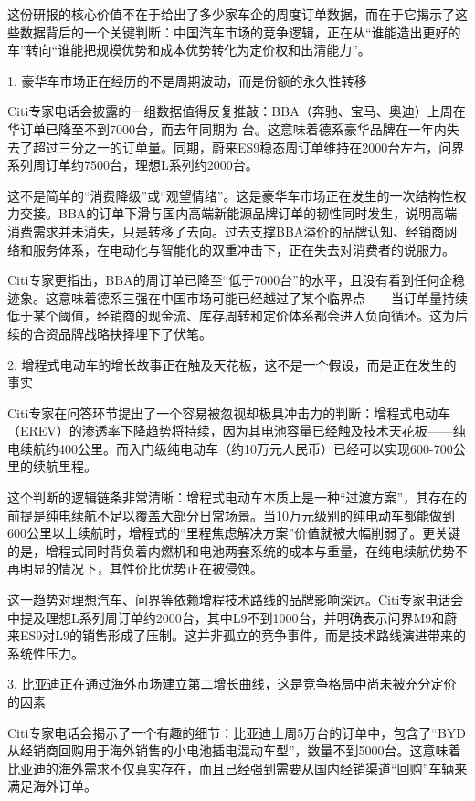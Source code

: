 \documentclass[11pt]{ctexart}
\begin{document}
这份研报的核心价值不在于给出了多少家车企的周度订单数据，而在于它揭示了这些数据背后的一个关键判断：中国汽车市场的竞争逻辑，正在从“谁能造出更好的车”转向“谁能把规模优势和成本优势转化为定价权和出清能力”。

1. 豪华车市场正在经历的不是周期波动，而是份额的永久性转移

Citi专家电话会披露的一组数据值得反复推敲：BBA（奔驰、宝马、奥迪）上周在华订单已降至不到7000台，而去年同期为 台。这意味着德系豪华品牌在一年内失去了超过三分之一的订单量。同期，蔚来ES9稳态周订单维持在2000台左右，问界系列周订单约7500台，理想L系列约2000台。

这不是简单的“消费降级”或“观望情绪”。这是豪华车市场正在发生的一次结构性权力交接。BBA的订单下滑与国内高端新能源品牌订单的韧性同时发生，说明高端消费需求并未消失，只是转移了去向。过去支撑BBA溢价的品牌认知、经销商网络和服务体系，在电动化与智能化的双重冲击下，正在失去对消费者的说服力。

Citi专家更指出，BBA的周订单已降至“低于7000台”的水平，且没有看到任何企稳迹象。这意味着德系三强在中国市场可能已经越过了某个临界点——当订单量持续低于某个阈值，经销商的现金流、库存周转和定价体系都会进入负向循环。这为后续的合资品牌战略抉择埋下了伏笔。

2. 增程式电动车的增长故事正在触及天花板，这不是一个假设，而是正在发生的事实

Citi专家在问答环节提出了一个容易被忽视却极具冲击力的判断：增程式电动车（EREV）的渗透率下降趋势将持续，因为其电池容量已经触及技术天花板——纯电续航约400公里。而入门级纯电动车（约10万元人民币）已经可以实现600-700公里的续航里程。

这个判断的逻辑链条非常清晰：增程式电动车本质上是一种“过渡方案”，其存在的前提是纯电续航不足以覆盖大部分日常场景。当10万元级别的纯电动车都能做到600公里以上续航时，增程式的“里程焦虑解决方案”价值就被大幅削弱了。更关键的是，增程式同时背负着内燃机和电池两套系统的成本与重量，在纯电续航优势不再明显的情况下，其性价比优势正在被侵蚀。

这一趋势对理想汽车、问界等依赖增程技术路线的品牌影响深远。Citi专家电话会中提及理想L系列周订单约2000台，其中L9不到1000台，并明确表示问界M9和蔚来ES9对L9的销售形成了压制。这并非孤立的竞争事件，而是技术路线演进带来的系统性压力。

3. 比亚迪正在通过海外市场建立第二增长曲线，这是竞争格局中尚未被充分定价的因素

Citi专家电话会揭示了一个有趣的细节：比亚迪上周5万台的订单中，包含了“BYD从经销商回购用于海外销售的小电池插电混动车型”，数量不到5000台。这意味着比亚迪的海外需求不仅真实存在，而且已经强到需要从国内经销渠道“回购”车辆来满足海外订单。
\end{document}
